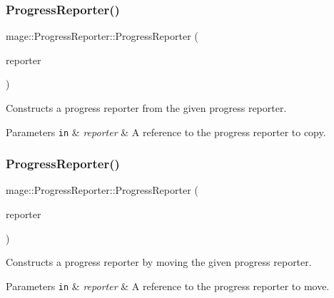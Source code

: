 \subsubsection{\texorpdfstring{Progress\+Reporter()}{ProgressReporter()}\hspace{0.1cm}{\footnotesize\ttfamily [2/3]}}
{\footnotesize\ttfamily mage\+::\+Progress\+Reporter\+::\+Progress\+Reporter (\begin{DoxyParamCaption}\item[{const \hyperlink{classmage_1_1_progress_reporter}{Progress\+Reporter} \&}]{reporter }\end{DoxyParamCaption})\hspace{0.3cm}{\ttfamily [delete]}}

Constructs a progress reporter from the given progress reporter.


\begin{DoxyParams}[1]{Parameters}
\mbox{\tt in}  & {\em reporter} & A reference to the progress reporter to copy. \\
\hline
\end{DoxyParams}
\hypertarget{classmage_1_1_progress_reporter_a03a08df55eb7f7f744efc4543c042fcc}{}\label{classmage_1_1_progress_reporter_a03a08df55eb7f7f744efc4543c042fcc} 
\subsubsection{\texorpdfstring{Progress\+Reporter()}{ProgressReporter()}\hspace{0.1cm}{\footnotesize\ttfamily [3/3]}}
{\footnotesize\ttfamily mage\+::\+Progress\+Reporter\+::\+Progress\+Reporter (\begin{DoxyParamCaption}\item[{\hyperlink{classmage_1_1_progress_reporter}{Progress\+Reporter} \&\&}]{reporter }\end{DoxyParamCaption})\hspace{0.3cm}{\ttfamily [delete]}}

Constructs a progress reporter by moving the given progress reporter.


\begin{DoxyParams}[1]{Parameters}
\mbox{\tt in}  & {\em reporter} & A reference to the progress reporter to move. \\
\hline
\end{DoxyParams}
\hypertarget{classmage_1_1_progress_reporter_aa543239c6dd4474a77cf4cf6904c1b26}{}\label{classmage_1_1_progress_reporter_aa543239c6dd4474a77cf4cf6904c1b26} 
